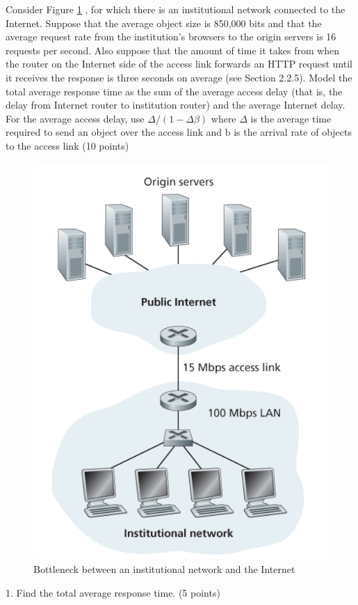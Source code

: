 \begin{exercise}[]{Consider Figure \ref{fig:2} , for which there is an institutional network connected to the Internet. Suppose that the average object size is 850,000 bits and that the average request rate from the institution's browsers to the origin servers is 16 requests per second. Also suppose that the amount of time it takes from when the router on the Internet side of the access link forwards an HTTP request until it receives the response is three seconds on average (see Section 2.2.5). Model the total average response time as the sum of the average access delay (that is, the delay from Internet router to institution router) and the average Internet delay. For the average access delay, use $\Delta /(1-\Delta \beta)$ where $\Delta$ is the average time required to send an object over the access link and $\mathrm{b}$ is the arrival rate of objects to the access link (10 points)
\begin{figure}[hb]
  \begin{center}
  \includegraphics[width=12cm]{img/ass2/hw2_2}
  \caption{Bottleneck between an institutional network and the Internet}
  \label{fig:2}
  \end{center}
\end{figure}
    1. Find the total average response time. (5 points)

}
\end{exercise}
